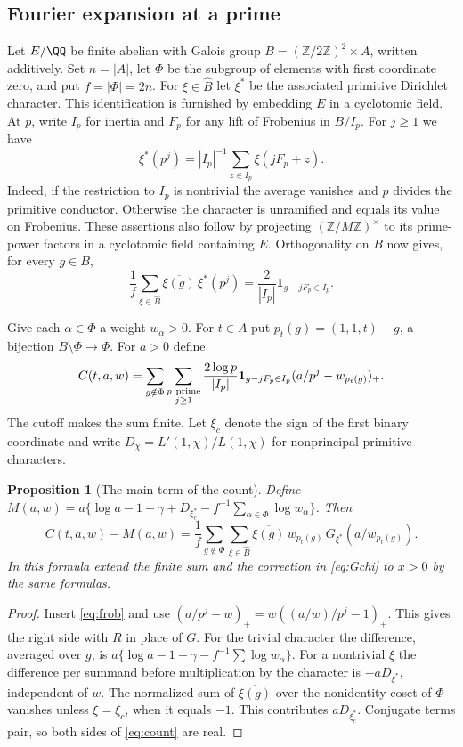 \documentclass[a4paper,11pt]{article}
\newtheorem{proposition}{Proposition}[section]
\theoremstyle{definition}
\theoremstyle{remark}
\newcommand{\ZZ}{\mathbb Z}\newcommand{\ord}{\operatorname{ord}}
\numberwithin{equation}{section}
\begin{document}
\subsection{Fourier expansion at a prime}\label{nav:I-23}
Let \(E/\QQ\) be finite abelian with Galois group \(B=(\ZZ/2\ZZ)^2\times A\), written additively. Set \(n=|A|\), let \(\Phi\) be the subgroup of elements with first coordinate zero, and put \(f=|\Phi|=2n\). For \(\xi\in\widehat B\) let \(\xi^*\) be the associated primitive Dirichlet character. This identification is furnished by embedding \(E\) in a cyclotomic field. At \(p\), write \(I_p\) for inertia and \(F_p\) for any lift of Frobenius in \(B/I_p\). For \(j\ge1\) we have
\[
 \xi^*(p^j)=|I_p|^{-1}\sum_{z\in I_p}\xi(jF_p+z).
\]
Indeed, if the restriction to \(I_p\) is nontrivial the average vanishes and \(p\) divides the primitive conductor. Otherwise the character is unramified and equals its value on Frobenius. These assertions also follow by projecting \((\ZZ/M\ZZ)^\times\) to its prime-power factors in a cyclotomic field containing \(E\). Orthogonality on \(B\) now gives, for every \(g\in B\),
\begin{equation}
 \frac1f\sum_{\xi\in\widehat B}\overline{\xi(g)}\,\xi^*(p^j)
   =\frac{2}{|I_p|}\mathbf1_{g-jF_p\in I_p}.                       \label{eq:frob}
\end{equation}

Give each \(\alpha\in\Phi\) a weight \(w_\alpha>0\). For \(t\in A\) put \(p_t(g)=(1,1,t)+g\), a bijection \(B\setminus\Phi\to\Phi\). For \(a>0\) define
\[
 C(t,a,w)=\sum_{g\notin\Phi}\sum_{\substack{p\ {\rm prime}\\ j\ge1}}
       \frac{2\log p}{|I_p|}\mathbf1_{g-jF_p\in I_p}
                         (a/p^j-w_{p_t(g)})_+ .
\]
The cutoff makes the sum finite. Let \(\xi_c\) denote the sign of the first binary coordinate and write \(D_\chi=L'(1,\chi)/L(1,\chi)\) for nonprincipal primitive characters.

\begin{proposition}[The main term of the count]\label{prop:count}
Define \(M(a,w)=a\{\log a-1-\gamma+D_{\xi_c^*}-f^{-1}\sum_{\alpha\in\Phi}\log w_\alpha\}\). Then
\begin{equation}
 C(t,a,w)-M(a,w)=\frac1f\sum_{g\notin\Phi}\sum_{\xi\in\widehat B}
   \overline{\xi(g)}\,w_{p_t(g)}\,G_{\xi^*}(a/w_{p_t(g)}).         \label{eq:count}
\end{equation}
In this formula extend the finite sum and the correction in \eqref{eq:Gchi} to \(x>0\) by the same formulas.
\end{proposition}
\begin{proof}
Insert \eqref{eq:frob} and use \((a/p^j-w)_+=w((a/w)/p^j-1)_+\). This gives the right side with \(R\) in place of \(G\). For the trivial character the difference, averaged over \(g\), is \(a\{\log a-1-\gamma-f^{-1}\sum\log w_\alpha\}\). For a nontrivial \(\xi\) the difference per summand before multiplication by the character is \(-aD_{\xi^*}\), independent of \(w\). The normalized sum of \(\overline{\xi(g)}\) over the nonidentity coset of \(\Phi\) vanishes unless \(\xi=\xi_c\), when it equals \(-1\). This contributes \(aD_{\xi_c^*}\). Conjugate terms pair, so both sides of \eqref{eq:count} are real.
\end{proof}
\end{document}

